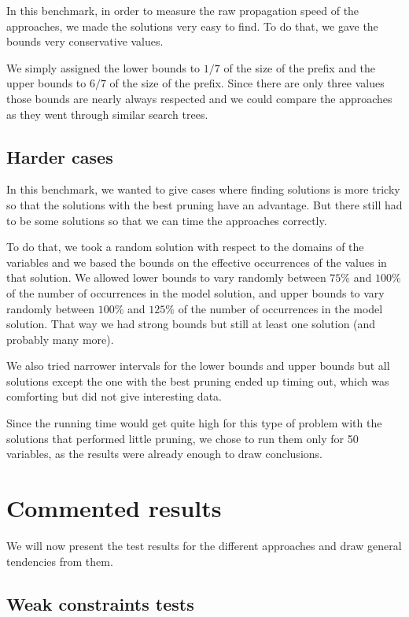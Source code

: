 \documentclass[a4paper,10pt]{article}
\begin{document}
In this benchmark, in order to measure the raw propagation speed of the approaches, we made the solutions very easy to find. To do that, we gave the bounds very conservative values.

We simply assigned the lower bounds to $1/7$ of the size of the prefix and the upper bounds to $6/7$ of the size of the prefix. Since there are only three values those bounds are nearly always respected and we could compare the approaches as they went through similar search trees.

\subsection{Harder cases}
\label{subsec:tests-hard}

In this benchmark, we wanted to give cases where finding solutions is more tricky so that the solutions with the best pruning have an advantage. But there still had to be some solutions so that we can time the approaches correctly.

To do that, we took a random solution with respect to the domains of the variables and we based the bounds on the effective occurrences of the values in that solution. We allowed lower bounds to vary randomly between $75\%$ and $100\%$ of the number of occurrences in the model solution, and upper bounds to vary randomly between $100\%$ and $125\%$ of the number of occurrences in the model solution. That way we had strong bounds but still at least one solution (and probably many more).

We also tried narrower intervals for the lower bounds and upper bounds but all solutions except the one with the best pruning ended up timing out, which was comforting but did not give interesting data.

Since the running time would get quite high for this type of problem with the solutions that performed little pruning, we chose to run them only for 50 variables, as the results were already enough to draw conclusions.

\section{Commented results}

We will now present the test results for the different approaches and draw general tendencies from them.

\subsection{Weak constraints tests}
\label{subsec:results-weak}
\end{document}
